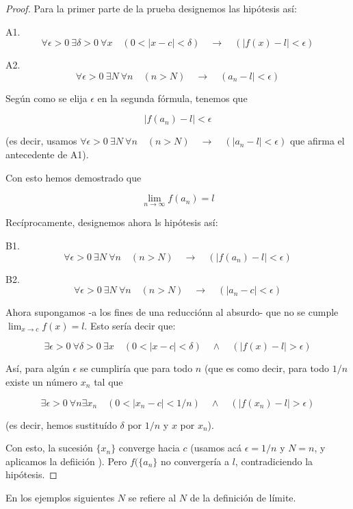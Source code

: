 \message{ !name(analisis-mat.tex)}\documentclass[12pt,a4paper]{article}
\begin{document}
\begin{proof}
Para la primer parte de la prueba designemos las hip\'otesis as\'i:

A1.
\[ \forall \epsilon > 0 \ \exists \delta > 0 \ \forall x \quad
(0<|x-c|< \delta) \quad \to \quad (|f(x) - l| < \epsilon) \]

A2. 
\[ \forall \epsilon > 0 \ \exists N \ \forall n \quad  (n > N) \quad \to \quad (a_n - l| < \epsilon) \]

Seg\'un como se elija \( \epsilon \) en la segunda f\'ormula, tenemos
que 


\[ | f(a_n) - l | < \epsilon \]

(es decir, usamos \( \forall \epsilon > 0 \ \exists N \ \forall n
\quad  (n > N) \quad \to \quad (|a_n - l| < \epsilon) \)
que afirma el antecedente de A1).

Con esto hemos demostrado que

\[ \lim_{n \to \infty} f( a_n )= l \]

Rec\'iprocamente, designemos ahora ls hip\'otesis as\'i:

B1. 
\[ \forall \epsilon > 0 \ \exists N \ \forall n \quad  (n > N) \quad
\to \quad ( |f(a_n) - l| < \epsilon) \]

B2.
\[ \forall \epsilon > 0 \ \exists N \ \forall n \quad  (n > N) \quad
\to \quad ( |a_n - c| < \epsilon) \]

Ahora supongamos -a los fines de una reducci\'onn al absurdo- que no
se cumple \( \lim_{x \to c} f( x )= l \). Esto ser\'ia decir que:


\[ \exists \epsilon > 0 \ \forall \delta > 0 \ \exists x \quad
(0<|x-c|< \delta) \quad \wedge \quad (|f(x) - l| > \epsilon) \]

As\'i, para alg\'un \( \epsilon \) se cumplir\'ia que para todo \( n
\) (que es como decir, para todo \( 1/n \) existe un n\'umero \( x_n
\) tal que 

\[ \exists \epsilon > 0 \ \forall n \exists x_n \quad
(0<|x_n-c|< 1/n) \quad \wedge \quad (|f(x_n) - l| > \epsilon) \]

(es decir, hemos sustitu\'ido \( \delta \) por \( 1/n \) y \( x \) por
\( x_n \)).

Con esto, la sucesi\'on \( \{ x_n \} \) converge hacia \( c \) (usamos
ac\'a \( \epsilon = 1/n \) y \( N = n \), y aplicamos la defiici\'on
). Pero \( f( \{ a_n \} \) no converger\'ia a \( l \),
contradiciendo la hip\'otesis.
\end{proof}

En los ejemplos siguientes \( N \) se refiere al \( N \) de la definici\'on
de l\'imite.
\end{document}
